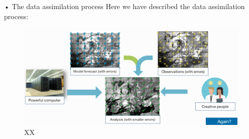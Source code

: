 \documentclass[12pt,oneside]{book}
\begin{document}
• The data assimilation process Here we have described the data
assimilation process:

\begin{figure}

{\centering \includegraphics[width=0.8\linewidth]{figures/Figure74} 

}

\caption{XX}\label{fig:DataAssimilation2}
\end{figure}
\end{document}
